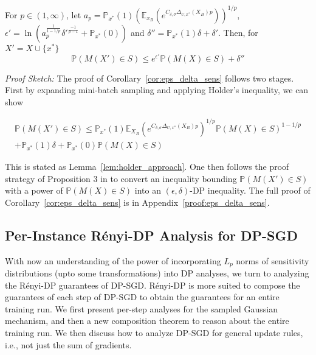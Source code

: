\begin{corollary}
\label{cor:eps_delta_sens}
For $p \in (1,\infty)$, let $a_p = \mathbb{P}_{x^*}(1) (\mathbb{E}_{x_{B}}(e^{C_{\delta,\sigma} \Delta_{U,x^*}(X_B)p}))^{1/p}$, $\epsilon' = \ln(a_p^{\frac{1}{1-1/p}}\delta'^{\frac{-1}{p-1}} + \mathbb{P}_{x^*}(0)) $ and $\delta'' = \mathbb{P}_{x^*}(1)\delta + \delta'$. Then, for $X' = X \cup \{x^*\}$ $$\mathbb{P}(M(X') \in S) \leq e^{\epsilon'} \mathbb{P}(M(X) \in S) + \delta''$$

\end{corollary}


\emph{Proof Sketch:} The proof of Corollary~\ref{cor:eps_delta_sens} follows two stages. First by expanding mini-batch sampling and applying Holder's inequality, we can show

\begin{multline}
    \mathbb{P}(M(X') \in S) \leq \mathbb{P}_{x^*}(1) \mathbb{E}_{X_B}(e^{C_{\delta,\sigma} \Delta_{U,x^*}(X_B)p})^{1/p} \mathbb{P}(M(X) \in S)^{1-1/p} \\ + \mathbb{P}_{x^*}(1)\delta + \mathbb{P}_{x^*}(0) \mathbb{P}(M(X) \in S)
\end{multline}

This is stated as Lemma~\ref{lem:holder_approach}. One then follows the proof strategy of Proposition 3 in \citet{mironov2017renyi} to convert an inequality bounding $\mathbb{P}(M(X') \in S)$ with a power of $\mathbb{P}(M(X) \in S)$ into an $(\epsilon,\delta)$-DP inequality. The full proof of Corollary~\ref{cor:eps_delta_sens} is in Appendix~\ref{proof:eps_delta_sens}.





\subsection{Per-Instance R\'enyi-DP Analysis for DP-SGD}

With now an understanding of the power of incorporating $L_p$ norms of sensitivity distributions (upto some transformations) into DP analyses, we turn to analyzing the R\'enyi-DP guarantees of DP-SGD. R\'enyi-DP is more suited to compose the guarantees of each step of DP-SGD to obtain the guarantees for an entire training run. We first present per-step analyses for the sampled Gaussian mechanism, and then a new composition theorem to reason about the entire training run. We then discuss how to analyze DP-SGD for general update rules, i.e., not just the sum of gradients.

